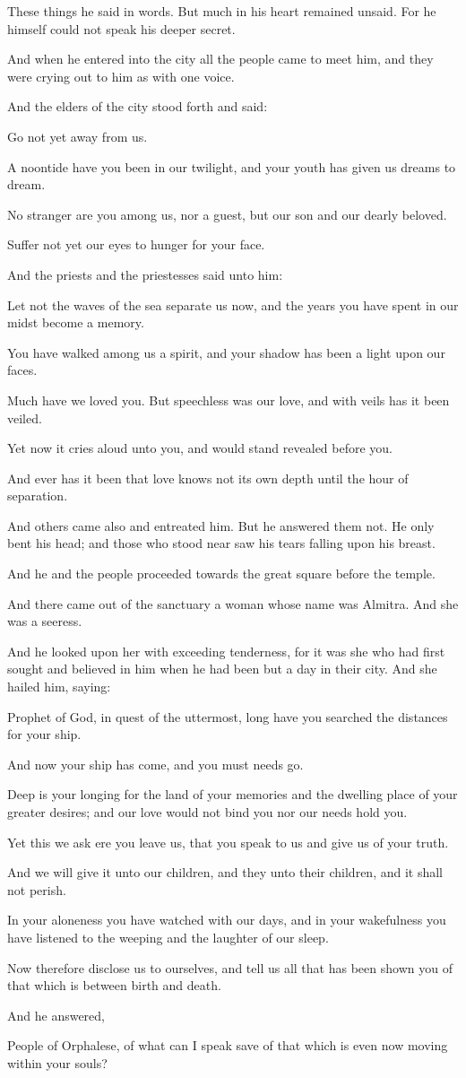 These things he said in words. But much
in his heart remained unsaid. For he
himself could not speak his deeper
secret.

And when he entered into the city all
the people came to meet him, and they
were crying out to him as with one
voice.

And the elders of the city stood forth
and said:

Go not yet away from us.

A noontide have you been in our
twilight, and your youth has given us
dreams to dream.

No stranger are you among us, nor
a guest, but our son and our dearly
beloved.

Suffer not yet our eyes to hunger for
your face.


And the priests and the priestesses said
unto him:

Let not the waves of the sea separate us
now, and the years you have spent in our
midst become a memory.

You have walked among us a spirit,
and your shadow has been a light
upon our faces.

Much have we loved you. But speechless
was our love, and with veils has it been
veiled.

Yet now it cries aloud unto you, and
would stand revealed before you.

And ever has it been that love knows
not its own depth until the hour of
separation.


And others came also and entreated him.
But he answered them not. He only bent
his head; and those who stood near saw
his tears falling upon his breast.

And he and the people proceeded towards
the great square before the temple.

And there came out of the sanctuary a
woman whose name was Almitra. And she
was a seeress.

And he looked upon her with exceeding
tenderness, for it was she who had first
sought and believed in him when he had
been but a day in their city. And
she hailed him, saying:

Prophet of God, in quest of the
uttermost, long have you searched the
distances for your ship.

And now your ship has come, and you must
needs go.

Deep is your longing for the land of
your memories and the dwelling place
of your greater desires; and our love
would not bind you nor our needs hold
you.

Yet this we ask ere you leave us, that
you speak to us and give us of your
truth.

And we will give it unto our children,
and they unto their children, and it
shall not perish.

In your aloneness you have watched with
our days, and in your wakefulness you
have listened to the weeping and the
laughter of our sleep.

Now therefore disclose us to ourselves,
and tell us all that has been shown
you of that which is between birth and
death.


And he answered,

People of Orphalese, of what can I
speak save of that which is even now
moving within your souls?
